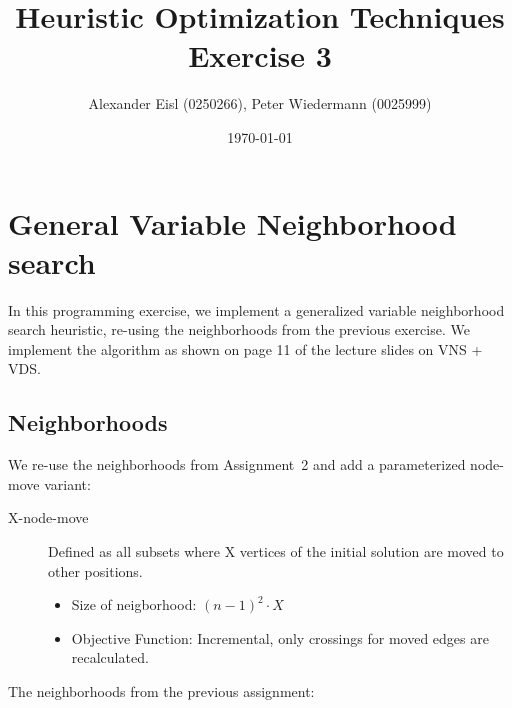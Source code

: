 \documentclass{scrartcl}
\author{Alexander Eisl (0250266), Peter Wiedermann (0025999)}
\date{\today}
\title{Heuristic Optimization Techniques \\ Exercise 3}
\begin{document}
\maketitle


\section{General Variable Neighborhood search}
\label{sec:general_vns}

In this programming exercise, we implement a generalized variable
neighborhood search heuristic, re-using the neighborhoods from the
previous exercise. We implement the algorithm as shown on page 11 of
the lecture slides on VNS + VDS.



\subsection{Neighborhoods}
\label{neighborhoods}
We re-use the neighborhoods from Assignment~2 and add a parameterized node-move variant:

\begin{description}
\item[X-node-move] 
Defined as all subsets where X vertices of the initial solution are moved to other positions.

\begin{itemize}
\item Size of neigborhood: $(n-1)^2 \cdot X $
\item Objective Function: Incremental, only crossings for moved edges are recalculated.
\end{itemize}

\end{description}
 
The neighborhoods from the previous assignment:
\end{document}
